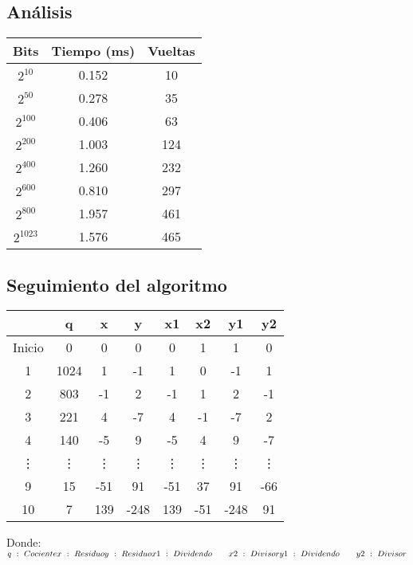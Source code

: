 \documentclass[11pt, conference]{IEEEtran}
\begin{document}
\subsection{Análisis}
\begin{center}
	\begin{tabular}{|c|c|c|}
		\hline
		\textbf{Bits}& {\bf Tiempo} (ms) & {\bf Vueltas} \\	\hline
		$2^{10}$ & 0.152 & 10\\ \hline
		$2^{50}$ & 0.278 & 35 \\ \hline
		$2^{100}$ & 0.406 & 63 \\ \hline
		$2^{200}$ & 1.003 & 124 \\ \hline
		$2^{400}$ & 1.260 & 232 \\ \hline
		$2^{600}$ & 0.810 & 297 \\ \hline
		$2^{800}$ & 1.957 & 461 \\ \hline
		$2^{1023}$ & 1.576 & 465 \\ \hline
	\end{tabular}
\end{center}

\subsection{Seguimiento del algoritmo}

\begin{center}
	\begin{tabular}{|c|c|c|c|c|c|c|c|}
		\hline
		   & \textbf{q} & \textbf{x} & \textbf{y} & \textbf{x1} & \textbf{x2}& \textbf{y1}& \textbf{y2} \\	\hline
		Inicio &  0 & 0 & 0 & 0 & 1 & 1 & 0\\ \hline
		1 & 1024 & 1 & -1 & 1 & 0 & -1 & 1\\ \hline
		2 & 803  & -1 & 2 & -1 & 1 & 2 & -1\\ \hline
		3 & 221  & 4 & -7 & 4 & -1 & -7 & 2\\ \hline
		4 & 140  & -5 & 9 & -5 & 4 & 9 & -7\\ \hline
		\vdots  & \vdots & \vdots & \vdots& \vdots& \vdots& \vdots& \vdots \\ \hline
		9 & 15  & -51 & 91 & -51 & 37 & 91 & -66\\ \hline
		10& 7  & 139 & -248 & 139 & -51 & -248 & 91\\ \hline
	\end{tabular}
\end{center}
Donde:\\
$
q\ :\ Cociente \\
x\ :\ Residuo \\
y\ :\ Residuo \\
x1\ :\ Dividendo \qquad x2\ :\ Divisor \\
y1\ :\ Dividendo \qquad y2\ :\ Divisor \\
$
\end{document}
